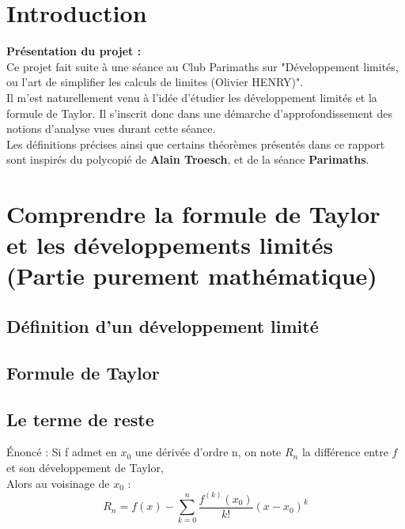\documentclass{article}
\begin{document}

\section{Introduction}

\textbf{Présentation du projet : } \\
Ce projet fait suite à une séance au Club Parimaths sur "Développement limités, ou l'art de simplifier les calculs de limites (Olivier HENRY)". \\
Il m'est naturellement venu à l'idée d'étudier les développement limités et la formule de Taylor. Il s'inscrit donc dans une démarche d'approfondissement des notions d'analyse vues durant cette séance. \\
Les définitions précises ainsi que certains théorèmes présentés dans ce rapport sont inspirés du polycopié de \textbf{Alain Troesch}, et de la séance \textbf{Parimaths}.

\section{Comprendre la formule de Taylor et les développements limités (Partie purement mathématique)}

\subsection{Définition d’un développement limité}

\subsection{Formule de Taylor}
 {}


\subsection{Le terme de reste}
{Énoncé : Si f admet en $x_0$ une dérivée d'ordre n, on note $R_n$ la différence entre $f$
et son développement de Taylor, \\
Alors au voisinage de $x_0$ : 
$$R_n = f(x) - \displaystyle\sum_{k=0}^{n} \frac{f^{(k)}(x_0)}{k!}(x - x_0)^k $$
}{}
\end{document}
